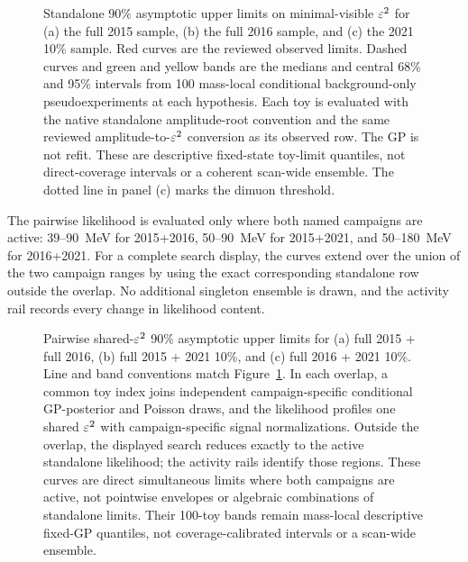 \begin{figure}[H]
\centering
{}
\caption{Standalone 90\% asymptotic \CLs{} upper limits on minimal-visible
$\varepsilon^2$ for (a) the full 2015 sample, (b) the full 2016 sample, and (c) the
2021 10\% sample. Red curves are the reviewed observed limits. Dashed curves
and green and yellow bands are the medians and central 68\% and 95\% intervals
from 100 mass-local conditional background-only pseudoexperiments at each
hypothesis. Each toy is evaluated with the native standalone amplitude-root
convention and the same reviewed amplitude-to-$\varepsilon^2$ conversion as its
observed row. The GP is not refit. These are descriptive fixed-state
toy-limit quantiles, not direct-coverage intervals or a coherent scan-wide
ensemble. The dotted line in panel (c) marks the dimuon threshold.}
\label{fig:results-v4p2-standalone-bands}
\end{figure}

The pairwise likelihood is evaluated only where both named campaigns are
active: 39--90~MeV for 2015+2016, 50--90~MeV for 2015+2021, and
50--180~MeV for 2016+2021. For a complete search display, the curves extend
over the union of the two campaign ranges by using the exact corresponding
standalone row outside the overlap. No additional singleton ensemble is drawn,
and the activity rail records every change in likelihood content.

\begin{figure}[H]
\centering
{}
\caption{Pairwise shared-$\varepsilon^2$ 90\% asymptotic \CLs{} upper limits for
(a) full 2015 + full 2016, (b) full 2015 + 2021 10\%, and (c) full 2016 +
2021 10\%. Line and band conventions match
Figure~\ref{fig:results-v4p2-standalone-bands}. In each overlap, a common toy
index joins independent campaign-specific conditional GP-posterior and Poisson
draws, and the likelihood profiles one shared $\varepsilon^2$ with campaign-specific
signal normalizations. Outside the overlap, the displayed search reduces
exactly to the active standalone likelihood; the activity rails identify those
regions. These curves are direct simultaneous limits where both campaigns are
active, not pointwise envelopes or algebraic combinations of standalone
limits. Their 100-toy bands remain mass-local descriptive fixed-GP quantiles,
not coverage-calibrated intervals or a scan-wide ensemble.}
\label{fig:results-v4p2-pairwise-bands}
\end{figure}

